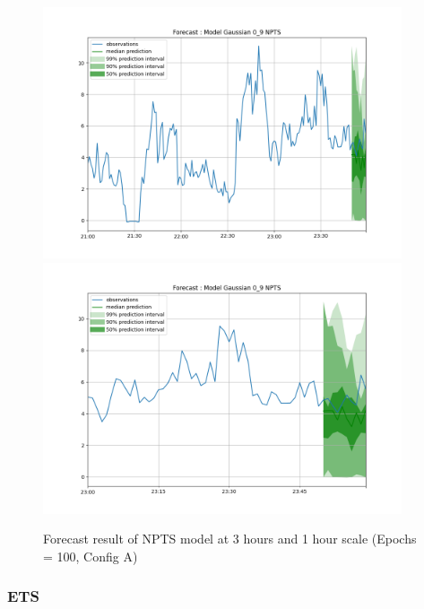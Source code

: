 \begin{figure}[H]
    \centering
    \includegraphics[width=400px]{plots/forecast/a/model/Gaussian/0_9/NPTS/180.png}
    \includegraphics[width=400px]{plots/forecast/a/model/Gaussian/0_9/NPTS/60.png}
    \caption{Forecast result of NPTS model at 3 hours and 1 hour scale (Epochs = 100, Config A)}
    \label{fig:npts}
\end{figure}

\subsubsection{ETS} \label{comp_ets}


